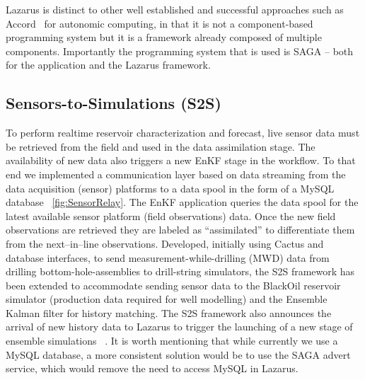 \documentclass{rspublic}
\begin{document}
Lazarus is distinct to other well established and successful
approaches such as Accord~\cite{accord} for autonomic computing, in
that it is not a component-based programming system but it is a
framework already composed of multiple components. Importantly the
programming system that is used is SAGA -- both for the application
and the Lazarus framework.


\subsection{Sensors-to-Simulations (S2S)} 

To perform realtime reservoir characterization and forecast, live
sensor data must be retrieved from the field and used in the data
assimilation stage. The availability of new data also triggers a new
EnKF stage in the workflow. To that end we implemented a communication
layer based on data streaming from the data acquisition (sensor)
platforms to a data spool in the form of a MySQL database
~\ref{fig:SensorRelay}. The EnKF application queries the data spool
for the latest available sensor platform (field observations)
data. Once the new field observations are retrieved they are labeled
as ``assimilated'' to differentiate them from the next--in--line
observations.  Developed, initially using Cactus and database
interfaces, to send measurement-while-drilling (MWD) data from
drilling bottom-hole-assemblies to drill-string simulators, the S2S
framework has been extended to accommodate sending sensor data to the
BlackOil reservoir simulator (production data required for well
modelling) and the Ensemble Kalman filter for history matching. The
S2S framework also announces the arrival of new history data to
Lazarus to trigger the launching of a new stage of ensemble
simulations ~\citep{Duff1,Duff2}.  It is worth mentioning that while
currently we use a MySQL database, a more consistent solution would be
to use the SAGA advert service, which would remove the need to access
MySQL in Lazarus.
\end{document}

